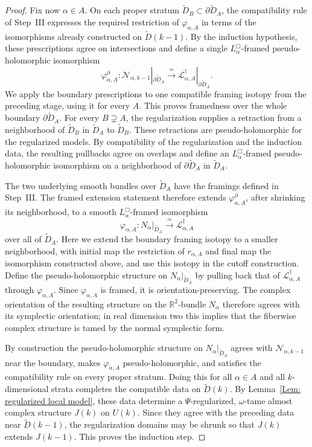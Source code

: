 \documentclass[11pt]{amsart}
\numberwithin{equation}{section}
\theoremstyle{plain}
\theoremstyle{definition}
\newcommand{\RR}{\mathbb{R}}
\newcommand{\scrL}{\mathscr{L}}
\newcommand{\scrN}{\mathscr{N}}
\begin{document}
\begin{proof}
Fix now $\alpha\in A$. On each proper stratum $\widetilde
D_B\subset\partial\widetilde D_A$, the compatibility rule of Step~III expresses
the required restriction of $\varphi_{\alpha,A}$ in terms of the isomorphisms
already constructed on $\widetilde D(k-1)$. By the induction hypothesis, these
prescriptions agree on intersections and define a single $L^\Box_\alpha$-framed
pseudo-holomorphic isomorphism
\begin{equation}
\label{Eqn: boundary phi}
\varphi^\partial_{\alpha,A}:
\scrN_{\alpha,k-1}|_{\partial\widetilde D_A}
\xrightarrow{\;\simeq\;}
\scrL^\dagger_{\alpha,A}|_{\partial\widetilde D_A}.
\end{equation}
We apply the boundary prescriptions to one compatible framing isotopy from the
preceding stage, using it for every $A$. This proves framedness over the whole
boundary $\partial\widetilde D_A$. For every $B\supsetneq A$, the regularization
supplies a retraction from a neighborhood of $\widetilde D_B$ in $\widetilde
D_A$ to $\widetilde D_B$. These retractions are pseudo-holomorphic for the
regularized models. By compatibility of the regularization and the induction
data, the resulting pullbacks agree on overlaps and define an
$L^\Box_\alpha$-framed pseudo-holomorphic isomorphism on a neighborhood of
$\partial\widetilde D_A$ in $\widetilde D_A$.

The two underlying smooth bundles over $\widetilde D_A$ have the framings
defined in Step~III. The framed extension statement therefore extends
$\varphi^\partial_{\alpha,A}$, after shrinking its neighborhood, to a smooth
$L^\Box_\alpha$-framed isomorphism
\[
\varphi_{\alpha,A}:
N_\alpha|_{\widetilde D_A}
\xrightarrow{\;\simeq\;}
\scrL^\dagger_{\alpha,A}
\]
over all of $\widetilde D_A$. Here we extend the boundary framing isotopy to a
smaller neighborhood, with initial map the restriction of $r_{\alpha,A}$ and
final map the isomorphism constructed above, and use this isotopy in the cutoff
construction. Define the pseudo-holomorphic structure on $N_\alpha|_{\widetilde
D_A}$ by pulling back that of $\scrL^\dagger_{\alpha,A}$ through
$\varphi_{\alpha,A}$. Since $\varphi_{\alpha,A}$ is framed, it is
orientation-preserving. The complex orientation of the resulting structure on
the $\RR^2$-bundle $N_\alpha$ therefore agrees with its symplectic orientation;
in real dimension two this implies that the fiberwise complex structure is tamed
by the normal symplectic form.

By construction the pseudo-holomorphic structure on
$N_\alpha|_{\widetilde D_A}$ agrees with $\scrN_{\alpha,k-1}$ near the
boundary, makes $\varphi_{\alpha,A}$ pseudo-holomorphic, and satisfies the
compatibility rule on every proper stratum. Doing this for all
$\alpha\in A$ and all $k$-dimensional strata completes the compatible data on
$\widetilde D(k)$. By Lemma~\ref{Lem: regularized local model}, these data
determine a $\Psi$-regularized, $\omega$-tame almost complex structure
$J(k)$ on $U(k)$. Since they agree with the preceding data near
$\widetilde D(k-1)$, the regularization domains may be shrunk so that $J(k)$
extends $J(k-1)$. This proves the induction step.


\end{proof}
\end{document}
